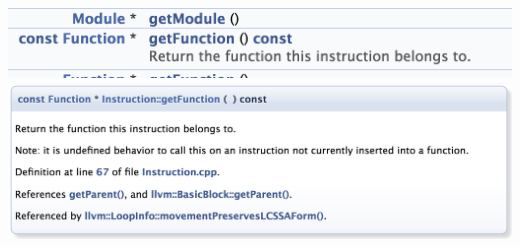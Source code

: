 \documentclass[a4paper,12pt,twoside]{book}
\begin{document}
\begin{itemize}
\includegraphics[scale=0.45]{pics/dox1.png} \newline
\includegraphics[scale=0.45]{pics/dox2.png} \newline

\end{itemize}
\end{document}
